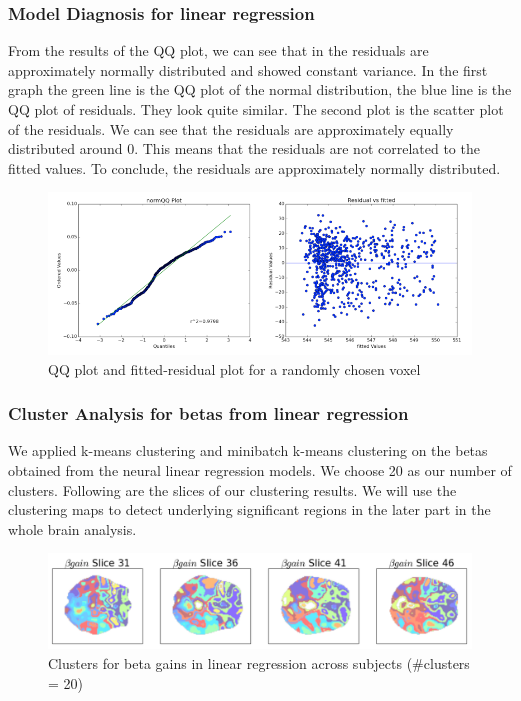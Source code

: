 \documentclass[11pt]{article}
\begin{document}
\subsubsection{Model Diagnosis for linear regression}

From the results of the QQ plot, we can see that in the residuals are approximately 
normally distributed and showed constant variance. In the first graph the green line is the QQ plot 
of the normal distribution, the blue line is the QQ plot of residuals. They 
look quite similar. The second plot is the scatter plot of the residuals. We 
can see that the residuals are approximately equally distributed around 0. This 
means that the residuals are not correlated to the fitted values. To conclude, 
the residuals are approximately normally distributed.

\begin{figure}[H]
    \centering
        \includegraphics[scale=0.4]{figures/Regression2/diagnosis.png}
    \caption{QQ plot and fitted-residual plot for a randomly chosen voxel}
\end{figure}

\subsubsection{Cluster Analysis for betas from linear regression}

We applied k-means clustering and minibatch k-means clustering on the betas 
obtained from the neural linear regression models. We choose 20 as our number 
of clusters. Following are the slices of our clustering results. We will use 
the clustering maps to detect underlying significant regions in the later part 
in the whole brain analysis.

\begin{figure}[H]
    \centering
        \includegraphics[scale=0.4]{figures/Regression2/beta_gain_cluster.png}
    \caption{Clusters for beta gains in linear regression across 
    subjects (\#clusters = 20)}
\end{figure}
\end{document}
